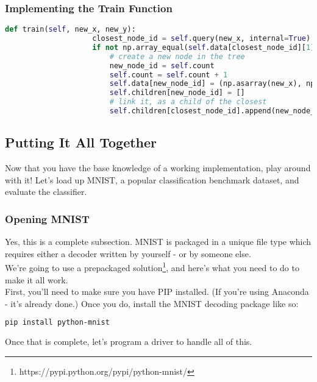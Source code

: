 \documentclass[12pt,letterpaper]{article}
\begin{document}
			\subsubsection{Implementing the Train Function}
				\begin{lstlisting}[language=Python]
				def train(self, new_x, new_y):
					closest_node_id = self.query(new_x, internal=True)
					if not np.array_equal(self.data[closest_node_id][1], new_y):
						# create a new node in the tree
						new_node_id = self.count
						self.count = self.count + 1
						self.data[new_node_id] = (np.asarray(new_x), np.asarray(new_y))
						self.children[new_node_id] = []
						# link it, as a child of the closest
						self.children[closest_node_id].append(new_node_id)
				\end{lstlisting}
				
		\subsection{Putting It All Together}
			Now that you have the base knowledge of a working implementation, play around with it! Let's load up MNIST, a popular classification benchmark dataset, and evaluate the classifier.	
			\subsubsection{Opening MNIST}
				Yes, this is a complete subsection. MNIST is packaged in a unique file type which requires either a decoder written by yourself - or by someone else.\\ We're going to use a prepackaged solution\footnote{https://pypi.python.org/pypi/python-mnist/}, and here's what you need to do to make it all work.\\
				First, you'll need to make sure you have PIP installed. (If you're using Anaconda - it's already done.) Once you do, install the MNIST decoding package like so: 
				\begin{lstlisting}[language=Bash]
				pip install python-mnist\end{lstlisting} 
				Once that is complete, let's program a driver to handle all of this. 
\end{document}

